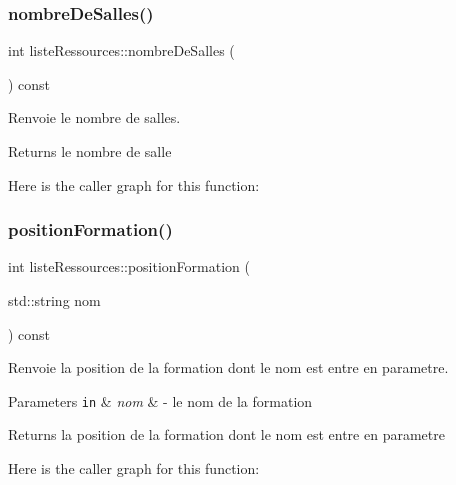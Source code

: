 \subsubsection{\texorpdfstring{nombre\+De\+Salles()}{nombreDeSalles()}}
{\footnotesize\ttfamily int liste\+Ressources\+::nombre\+De\+Salles (\begin{DoxyParamCaption}{ }\end{DoxyParamCaption}) const}



Renvoie le nombre de salles. 

\begin{DoxyReturn}{Returns}
le nombre de salle 
\end{DoxyReturn}
Here is the caller graph for this function\+:
\hypertarget{classliste_ressources_a1649d1144f57339c52731acf2d5cfa51}{}\label{classliste_ressources_a1649d1144f57339c52731acf2d5cfa51} 
\subsubsection{\texorpdfstring{position\+Formation()}{positionFormation()}}
{\footnotesize\ttfamily int liste\+Ressources\+::position\+Formation (\begin{DoxyParamCaption}\item[{std\+::string}]{nom }\end{DoxyParamCaption}) const}



Renvoie la position de la formation dont le nom est entre en parametre. 


\begin{DoxyParams}[1]{Parameters}
\mbox{\tt in}  & {\em nom} & -\/ le nom de la formation \\
\hline
\end{DoxyParams}
\begin{DoxyReturn}{Returns}
la position de la formation dont le nom est entre en parametre 
\end{DoxyReturn}
Here is the caller graph for this function\+:
\hypertarget{classliste_ressources_a1d7b514a5f879849283a5326bd102d9c}{}\label{classliste_ressources_a1d7b514a5f879849283a5326bd102d9c} 

